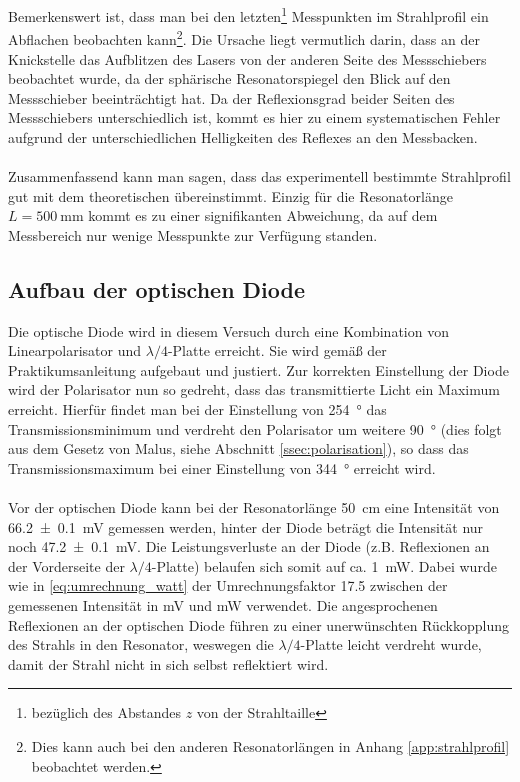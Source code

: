 \documentclass[11pt, a4paper]{article}
\numberwithin{equation}{section}
\begin{document}
Bemerkenswert ist, dass man bei den letzten\footnote{bezüglich des Abstandes $z$ von der Strahltaille} Messpunkten im Strahlprofil ein Abflachen beobachten kann\footnote{Dies kann auch bei den anderen Resonatorlängen in Anhang \ref{app:strahlprofil} beobachtet werden.}.
Die Ursache liegt vermutlich darin, dass an der Knickstelle das Aufblitzen des Lasers von der anderen Seite des Messschiebers beobachtet wurde, da der sphärische Resonatorspiegel den Blick auf den Messschieber beeinträchtigt hat.
Da der Reflexionsgrad beider Seiten des Messschiebers unterschiedlich ist, kommt es hier zu einem systematischen Fehler aufgrund der unterschiedlichen Helligkeiten des Reflexes an den Messbacken.\\
\\
Zusammenfassend kann man sagen, dass das experimentell bestimmte Strahlprofil gut mit dem theoretischen übereinstimmt.
Einzig für die Resonatorlänge $L = \SI{500}{\milli\metre}$ kommt es zu einer signifikanten Abweichung, da auf dem Messbereich nur wenige Messpunkte zur Verfügung standen.


\subsection{Aufbau der optischen Diode}

Die optische Diode wird in diesem Versuch durch eine Kombination von Linearpolarisator und $\lambda/4$-Platte erreicht.
Sie wird gemäß der Praktikumsanleitung aufgebaut und justiert.
Zur korrekten Einstellung der Diode wird der Polarisator nun so gedreht, dass das transmittierte Licht ein Maximum erreicht.
Hierfür findet man bei der Einstellung von \SI{254}{\degree} das Transmissionsminimum und verdreht den Polarisator um weitere \SI{90}{\degree} (dies folgt aus dem Gesetz von Malus, siehe Abschnitt \ref{ssec:polarisation}), so dass das Transmissionsmaximum bei einer Einstellung von \SI{344}{\degree} erreicht wird.\\
\\
Vor der optischen Diode kann bei der Resonatorlänge \SI{50}{\centi\metre} eine Intensität von \SI{66.2+-0.1}{\milli\volt} gemessen werden, hinter der Diode beträgt die Intensität nur noch \SI{47.2+-0.1}{\milli\volt}.
Die Leistungsverluste an der Diode (z.B. Reflexionen an der Vorderseite der $\lambda/4$-Platte) belaufen sich somit auf ca. \SI{1}{\milli\watt}.
Dabei wurde wie in \eqref{eq:umrechnung_watt} der Umrechnungsfaktor \num{17.5} zwischen der gemessenen Intensität in \si{\milli\volt} und \si{\milli\watt} verwendet.
Die angesprochenen Reflexionen an der optischen Diode führen zu einer unerwünschten Rückkopplung des Strahls in den Resonator, weswegen die $\lambda/4$-Platte leicht verdreht wurde, damit der Strahl nicht in sich selbst reflektiert wird.
\end{document}
